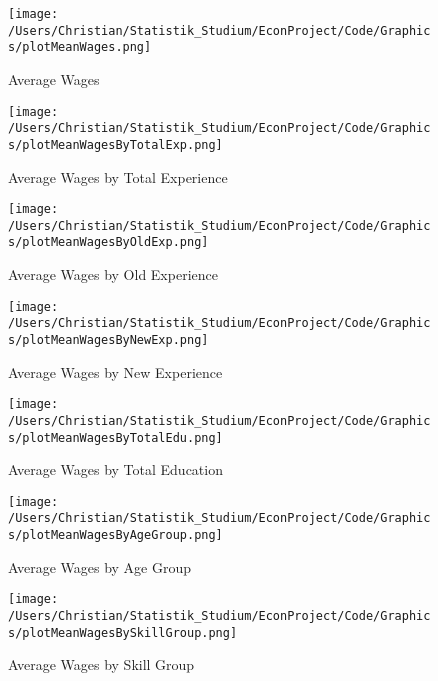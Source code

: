 \documentclass{article}
\begin{document}
\begin{figure}[!h]
    \centering
    \texttt{[image: /Users/Christian/Statistik\_Studium/EconProject/Code/Graphics/plotMeanWages.png]}
    \caption{Average Wages}
    \label{fig:MeanWages}
\end{figure}

\begin{figure}[!h]
    \centering
    \texttt{[image: /Users/Christian/Statistik\_Studium/EconProject/Code/Graphics/plotMeanWagesByTotalExp.png]}
    \caption{Average Wages by Total Experience}
    \label{fig:MeanWagesByTotalExp}
\end{figure}

\begin{figure}[!h]
    \centering
    \texttt{[image: /Users/Christian/Statistik\_Studium/EconProject/Code/Graphics/plotMeanWagesByOldExp.png]}
    \caption{Average Wages by Old Experience}
    \label{fig:MeanWagesByOldExp}
\end{figure}

\begin{figure}[!h]
    \centering
    \texttt{[image: /Users/Christian/Statistik\_Studium/EconProject/Code/Graphics/plotMeanWagesByNewExp.png]}
    \caption{Average Wages by New Experience}
    \label{fig:MeanWagesByNewExp}
\end{figure}

\begin{figure}[!h]
    \centering
    \texttt{[image: /Users/Christian/Statistik\_Studium/EconProject/Code/Graphics/plotMeanWagesByTotalEdu.png]}
    \caption{Average Wages by Total Education}
    \label{fig:MeanWagesByTotalEdu}
\end{figure}

\begin{figure}[!h]
    \centering
    \texttt{[image: /Users/Christian/Statistik\_Studium/EconProject/Code/Graphics/plotMeanWagesByAgeGroup.png]}
    \caption{Average Wages by Age Group}
    \label{fig:MeanWagesByAgeGroup}
\end{figure}

\begin{figure}[!h]
    \centering
    \texttt{[image: /Users/Christian/Statistik\_Studium/EconProject/Code/Graphics/plotMeanWagesBySkillGroup.png]}
    \caption{Average Wages by Skill Group}
    \label{fig:MeanWagesBySkillGroup}
\end{figure}
\end{document}

